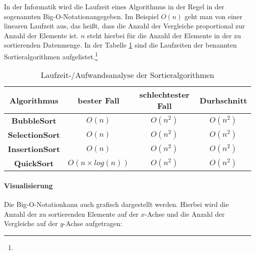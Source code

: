 \documentclass[./entry.tex]{subfiles}
\begin{document}
    In der Informatik wird die Laufzeit eines Algorithmus in der Regel in der sogenannten \dq Big-O-Notation\dq angegeben.
    Im Beispiel $O(n)$ geht man von einer linearen Laufzeit aus, das heißt, dass die Anzahl der
    Vergleiche proportional zur Anzahl der Elemente ist.
    $n$ steht hierbei für die Anzahl der Elemente in der zu sortierenden Datenmenge.
    In der Tabelle \ref{tab:runtimeanalysis} sind die Laufzeiten der benannten Sortieralgorithmen aufgelistet.\footnote{}


    \begin{table}[h]
        \begin{tabular}{|c|c|c|c|}
            \hline
            \textbf{Algorithmus}                                                     & \textbf{bester Fall} & \textbf{schlechtester Fall} & \textbf{Durhschnitt} \\
            \hline
            \textbf{BubbleSort}\tablefootnote{\bscite{bubble-sort-aufwand}}          & $O(n)$               & $O(n^2)$                    & $O(n^2)$             \\
            \hline
            \textbf{SelectionSort}\tablefootnote{\bscite{selection-sort-complexity}} & $O(n)$               & $O(n^2)$ & $O(n^2)$ \\
            \hline
            \textbf{InsertionSort}\tablefootnote{\bscite{insertion-sort}}            & $O(n)$               & $O(n^2)$                    & $O(n^2)$             \\
            \hline
            \textbf{QuickSort}\tablefootnote{\bscite{quick-sort}}                    & $O(n \times log(n))$ & $O(n^2)$                    & $O(n^2)$             \\
            \hline
        \end{tabular}
        \caption{Laufzeit-/Aufwandsanalyse der Sortieralgorithmen}
        \label{tab:runtimeanalysis}
    \end{table}

    \paragraph{Visualisierung} Die \dq Big-O-Notation\dq kann auch grafisch dargestellt werden.
    Hierbei wird die Anzahl der zu sortierenden Elemente auf der $x$-Achse und die Anzahl der Vergleiche auf der $y$-Achse aufgetragen:
\end{document}
